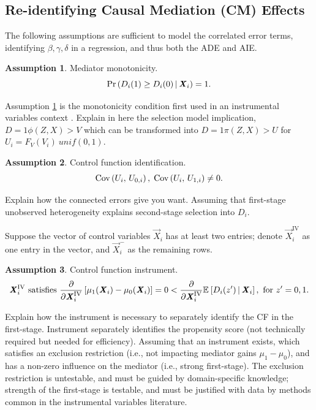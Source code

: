\subsection{Re-identifying Causal Mediation (CM) Effects}
The following assumptions are sufficient to model the correlated error terms, identifying $\beta, \gamma, \delta$ in a regression, and thus both the ADE and AIE.
\theoremstyle{definition}
\newtheorem{assumptionCF}{Assumption}
\renewcommand\theassumptionCF{CF--\arabic{assumptionCF}}
\begin{assumptionCF}
    \label{cf:monotonicity}
    Mediator monotonicity.
    \[ \Pr\left(  D_i(1) \geq D_i(0)  \, \middle\vert \, \boldsymbol{\mathit{X}}_i \right) = 1. \]
\end{assumptionCF}

Assumption \ref{cf:monotonicity} is the monotonicity condition first used in an instrumental variables context \citep{imbens1994identification}.
Explain in here the selection model implication, $D = 1{ \phi(Z, X) > V }$ which can be transformed into $D = 1{ \pi(Z, X) > U }$ for $U_i = F_V(V_i) ~ unif(0, 1)$.

\begin{assumptionCF}
    \label{cf:identification}
    Control function identification.
    \[ \text{Cov} \left( U_i, \, U_{0,i} \right), \; \text{Cov} \left( U_i, \, U_{1,i} \right) \neq 0. \]
\end{assumptionCF}

Explain how the connected errors give you want.
Assuming that first-stage unobserved heterogeneity explains second-stage selection into $D_i$.

Suppose the vector of control variables $\vec X_i$ has at least two entries;
denote $\vec X_i^{\text{IV}}$ as one entry in the vector, and $\vec X_i^-$ as the remaining rows.
\begin{assumptionCF}
    \label{cf:instrument}
    Control function instrument.
    \[ \boldsymbol{\mathit{X}}_i^{\text{IV}} \textnormal{ satisfies }
    \frac{\partial}{\partial\boldsymbol{\mathit{X}}_i^{\text{IV}}}\left[
        \mu_1(\boldsymbol{\mathit{X}}_i) - \mu_0(\boldsymbol{\mathit{X}}_i)\right] = 0
        < \frac{\partial}{\partial\boldsymbol{\mathit{X}}_i^{\text{IV}}}\mathbb{E}_{} \left[ D_i(z') \, \middle\vert \, \boldsymbol{\mathit{X}}_i \right],
        \textnormal{ for } z' = 0, 1. \]
\end{assumptionCF}

Explain how the instrument is necessary to separately identify the CF in the first-stage.
Instrument separately identifies the propensity score (not technically required but needed for efficiency).
Assuming that an instrument exists, which satisfies an exclusion restriction (i.e., not impacting mediator gains $\mu_1-\mu_0$), and has a non-zero influence on the mediator (i.e., strong first-stage).
The exclusion restriction is untestable, and must be guided by domain-specific knowledge; strength of the first-stage is testable, and must be justified with data by methods common in the instrumental variables literature.


